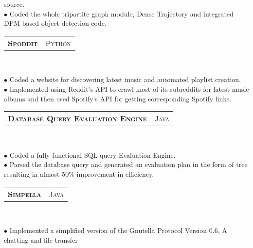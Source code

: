 \documentclass[10pt,a4paper,oneside]{article}
\begin{document}
\begin{minipage}[t]{0.63\textwidth}
\begin{adjustwidth}{7pt}{0pt}
{                source.\\
            $\bullet$ Coded the whole tripartite graph module, Dense Trajectory and integrated DPM based object detection code.}\\
        \end{adjustwidth}
        \begin{tabular}{c|c}
            \textbf{\normalsize S\textsc{poddit}}
            &\textmd{\normalsize P\textsc{ython}}
        \end{tabular}\\
         \vspace{-4mm}
        \begin{adjustwidth}{7pt}{0pt}
            {\footnotesize $\bullet$ Coded a website for discovering latest music and automated playlist creation.\\ 
            $\bullet$ Implemented using Reddit's API to crawl most of its subreddits for latest music albums and then used Spotify's API for
            getting corresponding Spotify links.}\\
        \end{adjustwidth}
        \begin{tabular}{c|c}
            \textbf{\normalsize D\textsc{atabase} Q\textsc{uery}
            E\textsc{valuation} E\textsc{ngine}}
            &\textmd{\normalsize J\textsc{ava}}
        \end{tabular}\\
         \vspace{-4mm}
        \begin{adjustwidth}{7pt}{0pt}
            {\footnotesize $\bullet$ Coded a fully functional SQL query Evaluation Engine.\\
            $\bullet$ Parsed the database query and generated an evaluation plan in the form of tree resulting in almost
            50\% improvement in efficiency.}\\
        \end{adjustwidth}
        \begin{tabular}{c|c}
            \textbf{\normalsize S\textsc{impella}}
            &\textmd{\normalsize J\textsc{ava}}
        \end{tabular}\\
         \vspace{-4mm}
        \begin{adjustwidth}{7pt}{0pt}
            {\footnotesize $\bullet$ Implemented a simplified version of the
            Gnutella Protocol Version 0.6, A chatting and file transfer
}
\end{adjustwidth}
\end{minipage}
\end{document}
